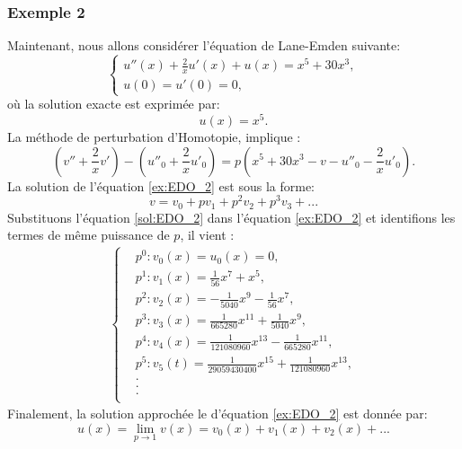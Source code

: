 \subsubsection*{Exemple 2}
Maintenant, nous allons considérer l'équation de Lane-Emden suivante:
\begin{equation}\label{ex:EDO_2}
    \begin{cases}
        u''(x)+\frac{2}{x}u'(x)+u(x) = x^5 + 30x^3,\\
        u(0) = u'(0)=0,
    \end{cases}
\end{equation}
où la solution exacte est exprimée par:
\begin{equation}
    u(x)=x^5.
\end{equation}
La méthode de perturbation d'Homotopie, implique :
\begin{equation} \label{sol:EDO_2}
    \left(v''+\frac{2}{x}v'\right) - \left(u''_0+\frac{2}{x}u'_0 \right) = p\left(x^5+30x^3-v-u''_0 - \frac{2}{x}u'_0\right).
\end{equation}
La solution de l'équation \ref{ex:EDO_2} est sous la forme:
\begin{equation}
    v=v_0+pv_1+p^2v_2+p^3v_3 + ...
\end{equation}
Substituons l'équation \ref{sol:EDO_2} dans l'équation \ref{ex:EDO_2} et identifions les termes de même puissance de $p$, il vient :\\
\begin{align*}
    \begin{cases}
        &p^0 : v_0(x) = u_0(x)=0,\\
        &p^1 : v_1(x)=\frac{1}{56}x^7 + x^5,\\
        &p^2 : v_2(x) = -\frac{1}{5040}x^9 - \frac{1}{56}x^7,\\
        &p^3 : v_3(x) = \frac{1}{665280}x^{11}+\frac{1}{5040}x^9,\\
        &p^4 : v_4(x) = \frac{1}{121080960} x^{13} - \frac{1}{665280}x^{11},\\
        &p^5 : v_5(t) = \frac{1}{29059430400}x^{15} + \frac{1}{121080960} x^{13},\\
        &    .\\
        &    .\\
        &    .\\
    \end{cases}
\end{align*}
Finalement, la solution approchée le d'équation \ref{ex:EDO_2} est donnée par:
\begin{equation}
    u(x)=\lim_{p\to 1} v(x)=v_0(x)+v_1(x)+v_2(x)+...
\end{equation}
